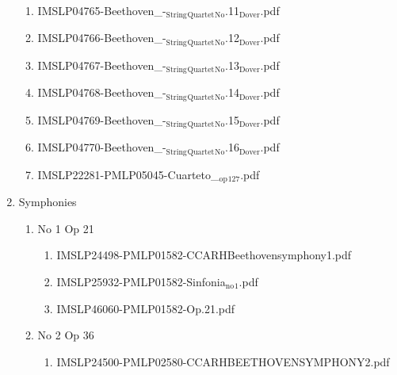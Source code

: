 \documentclass[11pt]{article}
\begin{document}
\begin{enumerate}
\begin{enumerate}
\item IMSLP04765-Beethoven\_-$_{\text{String}}$$_{\text{Quartet}}$$_{\text{No}}$.11$_{\text{Dover}}$.pdf
\label{sec-1-1-1-1-44-9-9-14}

\item IMSLP04766-Beethoven\_-$_{\text{String}}$$_{\text{Quartet}}$$_{\text{No}}$.12$_{\text{Dover}}$.pdf
\label{sec-1-1-1-1-44-9-9-15}

\item IMSLP04767-Beethoven\_-$_{\text{String}}$$_{\text{Quartet}}$$_{\text{No}}$.13$_{\text{Dover}}$.pdf
\label{sec-1-1-1-1-44-9-9-16}

\item IMSLP04768-Beethoven\_-$_{\text{String}}$$_{\text{Quartet}}$$_{\text{No}}$.14$_{\text{Dover}}$.pdf
\label{sec-1-1-1-1-44-9-9-17}

\item IMSLP04769-Beethoven\_-$_{\text{String}}$$_{\text{Quartet}}$$_{\text{No}}$.15$_{\text{Dover}}$.pdf
\label{sec-1-1-1-1-44-9-9-18}

\item IMSLP04770-Beethoven\_-$_{\text{String}}$$_{\text{Quartet}}$$_{\text{No}}$.16$_{\text{Dover}}$.pdf
\label{sec-1-1-1-1-44-9-9-19}

\item IMSLP22281-PMLP05045-Cuarteto\_$_{\text{op}}$$_{\text{127}}$.pdf
\label{sec-1-1-1-1-44-9-9-20}
\end{enumerate}

\item Symphonies
\label{sec-1-1-1-1-44-9-10}
\begin{enumerate}
\item No 1 Op 21
\label{sec-1-1-1-1-44-9-10-1}
\begin{enumerate}
\item IMSLP24498-PMLP01582-CCARHBeethovensymphony1.pdf
\label{sec-1-1-1-1-44-9-10-1-1}

\item IMSLP25932-PMLP01582-Sinfonia$_{\text{no}}$$_{\text{1}}$.pdf
\label{sec-1-1-1-1-44-9-10-1-2}

\item IMSLP46060-PMLP01582-Op.21.pdf
\label{sec-1-1-1-1-44-9-10-1-3}
\end{enumerate}

\item No 2 Op 36
\label{sec-1-1-1-1-44-9-10-2}
\begin{enumerate}
\item IMSLP24500-PMLP02580-CCARHBEETHOVENSYMPHONY2.pdf
\label{sec-1-1-1-1-44-9-10-2-1}


\end{enumerate}
\end{enumerate}
\end{enumerate}
\end{document}
